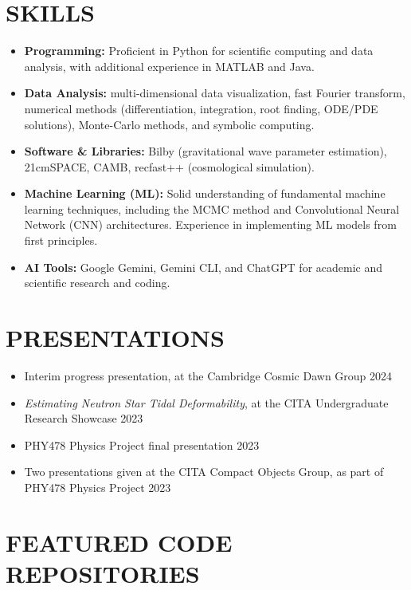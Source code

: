 \documentclass[a4paper,10pt]{extarticle}
\begin{document}
\section*{SKILLS}
\begin{itemize}
    \item \textbf{Programming:} Proficient in Python for scientific computing and data analysis, with additional experience in MATLAB and Java.
    \item \textbf{Data Analysis:} multi-dimensional data visualization, fast Fourier transform, numerical methods (differentiation, integration, root finding, ODE/PDE solutions), Monte-Carlo methods, and symbolic computing.
    \item \textbf{Software \& Libraries:} Bilby (gravitational wave parameter estimation), 21cmSPACE, CAMB, recfast++ (cosmological simulation).
    \item \textbf{Machine Learning (ML):} Solid understanding of fundamental machine learning techniques, including the MCMC method and Convolutional Neural Network (CNN) architectures. Experience in implementing ML models from first principles.
    \item \textbf{AI Tools:} Google Gemini, Gemini CLI, and ChatGPT for academic and scientific research and coding.
\end{itemize}

\section*{PRESENTATIONS}
\begin{itemize}
    \item Interim progress presentation, at the Cambridge Cosmic Dawn Group \hfill 2024

    \item \textit{Estimating Neutron Star Tidal Deformability}, at the CITA Undergraduate Research Showcase \hfill 2023

    \item PHY478 Physics Project final presentation \hfill 2023

    \item Two presentations given at the CITA Compact Objects Group, as part of PHY478 Physics Project \hfill 2023
\end{itemize}

\section*{FEATURED CODE REPOSITORIES}
\end{document}
